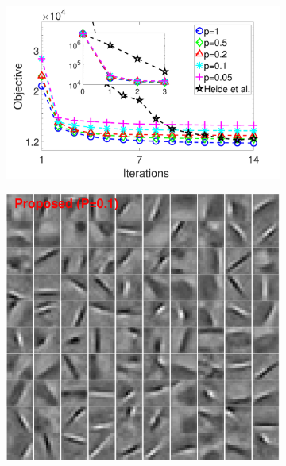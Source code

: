 \begin{figure}[h]
\centering
\begin{subfigure}{0.6\textwidth}
  \includegraphics[width=1\linewidth]{figure/iteVSobj.pdf}
\end{subfigure} 
\begin{subfigure}{0.3\textwidth}
  \includegraphics[width=1\linewidth]{figure/batchFruit100.pdf}
\end{subfigure}


\end{figure}
